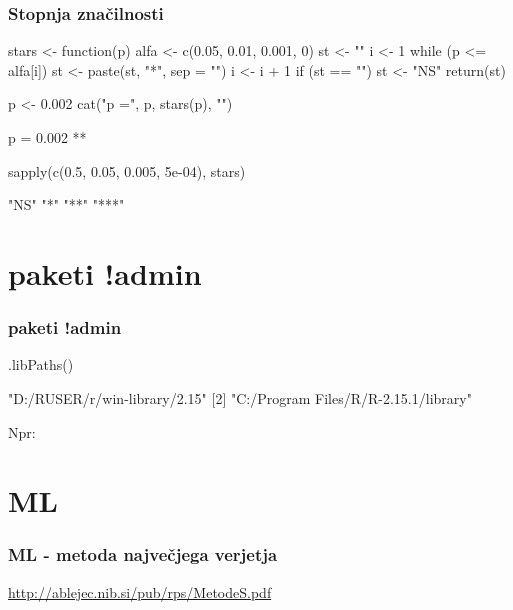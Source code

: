 \begin{frame}[fragile]
\frametitle{Stopnja značilnosti}
\begin{Schunk}
\begin{Sinput}
 stars <- function(p) {
     alfa <- c(0.05, 0.01, 0.001, 0)
     st <- ""
     i <- 1
     while (p <= alfa[i]) {
         st <- paste(st, "*", sep = "")
         i <- i + 1
     }
     if (st == "") 
         st <- "NS"
     return(st)
 }
\end{Sinput}
\end{Schunk}

\begin{Schunk}
\begin{Sinput}
 p <- 0.002
 cat("p =", p, stars(p), "\n")
\end{Sinput}
\begin{Soutput}
p = 0.002 ** 
\end{Soutput}
\begin{Sinput}
 sapply(c(0.5, 0.05, 0.005, 5e-04), stars)
\end{Sinput}
\begin{Soutput}
[1] "NS"  "*"   "**"  "***"
\end{Soutput}
\end{Schunk}
\end{frame}

\section{paketi !admin}


\begin{frame}[fragile]
\frametitle{paketi !admin}
\begin{Schunk}
\begin{Sinput}
 .libPaths()
\end{Sinput}
\begin{Soutput}
[1] "D:/RUSER/r/win-library/2.15"        
[2] "C:/Program Files/R/R-2.15.1/library"
\end{Soutput}
\end{Schunk}

Npr:


\end{frame}

\section{ML}
\begin{frame}[fragile]
\frametitle{ML - metoda največjega verjetja}
\url{http://ablejec.nib.si/pub/rps/MetodeS.pdf}
\end{frame}




